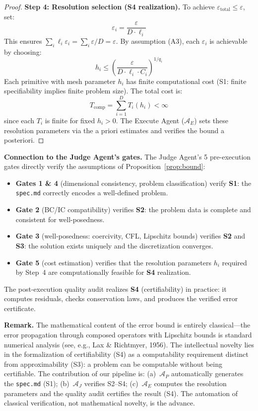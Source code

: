 \documentclass[11pt,a4paper]{article}
\newcommand{\Agent}{\mathcal{A}}
\begin{document}
\begin{proof}
\textbf{Step 4: Resolution selection (S4 realization).}
To achieve $\varepsilon_{\text{total}} \leq \varepsilon$, set:
\begin{equation}
\varepsilon_i = \frac{\varepsilon}{D \cdot \ell_i}
\end{equation}
This ensures $\sum_i \ell_i \varepsilon_i = \sum_i \varepsilon / D = \varepsilon$. By assumption (A3), each $\varepsilon_i$ is achievable by choosing:
\begin{equation}
h_i \leq \left(\frac{\varepsilon}{D \cdot \ell_i \cdot C_i}\right)^{1/q_i}
\end{equation}
Each primitive with mesh parameter $h_i$ has finite computational cost (S1: finite specifiability implies finite problem size). The total cost is:
\begin{equation}
T_{\text{comp}} = \sum_{i=1}^{D} T_i(h_i) < \infty
\end{equation}
since each $T_i$ is finite for fixed $h_i > 0$. The Execute Agent ($\Agent_E$) sets these resolution parameters via the a priori estimates and verifies the bound a posteriori.
\end{proof}

\textbf{Connection to the Judge Agent's gates.} The Judge Agent's 5 pre-execution gates directly verify the assumptions of Proposition~\ref{prop:bound}:
\begin{itemize}[nosep]
\item \textbf{Gates 1 \& 4} (dimensional consistency, problem classification) verify \textbf{S1}: the \texttt{spec.md} correctly encodes a well-defined problem.
\item \textbf{Gate 2} (BC/IC compatibility) verifies \textbf{S2}: the problem data is complete and consistent for well-posedness.
\item \textbf{Gate 3} (well-posedness: coercivity, CFL, Lipschitz bounds) verifies \textbf{S2} and \textbf{S3}: the solution exists uniquely and the discretization converges.
\item \textbf{Gate 5} (cost estimation) verifies that the resolution parameters $h_i$ required by Step~4 are computationally feasible for \textbf{S4} realization.
\end{itemize}

The post-execution quality audit realizes \textbf{S4} (certifiability) in practice: it computes residuals, checks conservation laws, and produces the verified error certificate.

\textbf{Remark.} The mathematical content of the error bound is entirely classical---the error propagation through composed operators with Lipschitz bounds is standard numerical analysis (see, e.g., Lax \& Richtmyer, 1956). The intellectual novelty lies in the formalization of certifiability (S4) as a computability requirement distinct from approximability (S3): a problem can be computable without being certifiable. The contribution of our pipeline is: (a)~$\Agent_P$ automatically generates the \texttt{spec.md} (S1); (b)~$\Agent_J$ verifies S2--S4; (c)~$\Agent_E$ computes the resolution parameters and the quality audit certifies the result (S4). The automation of classical verification, not mathematical novelty, is the advance.
\end{document}
